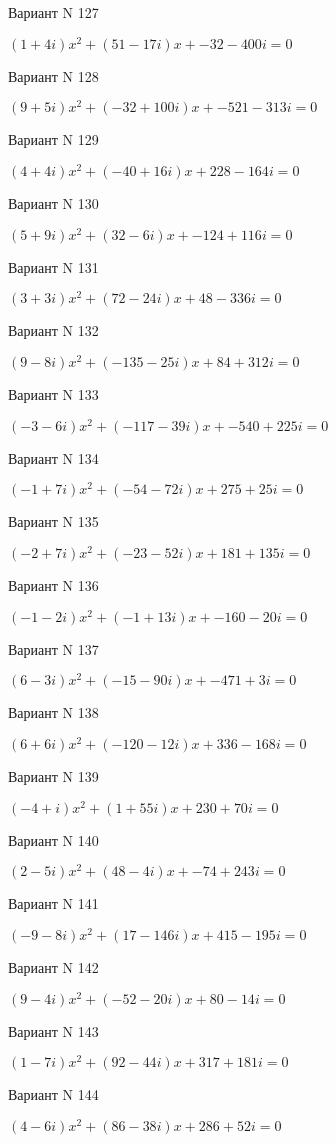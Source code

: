 \documentclass[11pt]{report}
\begin{document}
Вариант N 127

$(1 + 4 i)x^2 + (51 - 17 i)x + -32 - 400 i = 0$

Вариант N 128

$(9 + 5 i)x^2 + (-32 + 100 i)x + -521 - 313 i = 0$

Вариант N 129

$(4 + 4 i)x^2 + (-40 + 16 i)x + 228 - 164 i = 0$

Вариант N 130

$(5 + 9 i)x^2 + (32 - 6 i)x + -124 + 116 i = 0$

Вариант N 131

$(3 + 3 i)x^2 + (72 - 24 i)x + 48 - 336 i = 0$

Вариант N 132

$(9 - 8 i)x^2 + (-135 - 25 i)x + 84 + 312 i = 0$

Вариант N 133

$(-3 - 6 i)x^2 + (-117 - 39 i)x + -540 + 225 i = 0$

Вариант N 134

$(-1 + 7 i)x^2 + (-54 - 72 i)x + 275 + 25 i = 0$

Вариант N 135

$(-2 + 7 i)x^2 + (-23 - 52 i)x + 181 + 135 i = 0$

Вариант N 136

$(-1 - 2 i)x^2 + (-1 + 13 i)x + -160 - 20 i = 0$

Вариант N 137

$(6 - 3 i)x^2 + (-15 - 90 i)x + -471 + 3 i = 0$

Вариант N 138

$(6 + 6 i)x^2 + (-120 - 12 i)x + 336 - 168 i = 0$

Вариант N 139

$(-4 + i)x^2 + (1 + 55 i)x + 230 + 70 i = 0$

Вариант N 140

$(2 - 5 i)x^2 + (48 - 4 i)x + -74 + 243 i = 0$

Вариант N 141

$(-9 - 8 i)x^2 + (17 - 146 i)x + 415 - 195 i = 0$

Вариант N 142

$(9 - 4 i)x^2 + (-52 - 20 i)x + 80 - 14 i = 0$

Вариант N 143

$(1 - 7 i)x^2 + (92 - 44 i)x + 317 + 181 i = 0$

Вариант N 144

$(4 - 6 i)x^2 + (86 - 38 i)x + 286 + 52 i = 0$
\end{document}
